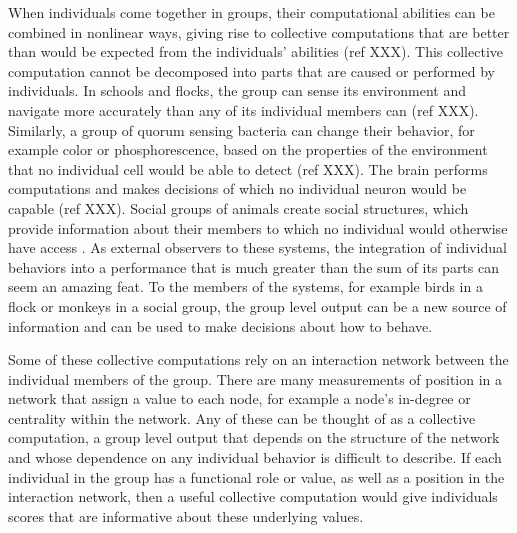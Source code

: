 \documentclass{article}
\begin{document}
When individuals come together in groups, their computational abilities can be combined in nonlinear ways, giving rise to collective computations that are better than would be expected from the individuals' abilities (ref XXX).  This collective computation cannot be decomposed into parts that are caused or performed by individuals. In schools and flocks, the group can sense its environment and navigate more accurately than any of its individual members can (ref XXX).  Similarly, a group of quorum sensing bacteria can change their behavior, for example color or phosphorescence, based on the properties of the environment that no individual cell would be able to detect (ref XXX). The brain performs computations and makes decisions of which no individual neuron would be capable (ref XXX). Social groups of animals create social structures, which provide information about their members to which no individual would otherwise have access \cite{Flack:2004oq,Flack:2006fk,Flack:2006uq}. As external observers to these systems, the integration of individual behaviors into a performance that is much greater than the sum of its parts can seem an amazing feat. To the members of the systems, for example birds in a flock or monkeys in a social group, the group level output can be a new source of information and can be used to make decisions about how to behave.

Some of these collective computations rely on an interaction network between the individual members of the group. There are many measurements of position in a network that assign a value to each node, for example a node's in-degree or centrality within the network.  Any of these can be thought of as a collective computation, a group level output that depends on the structure of the network and whose dependence on any individual behavior is difficult to describe.  If each individual in the group has a functional role or value, as well as a position in the interaction network, then a useful collective computation would give individuals scores that are informative about these underlying values.
\end{document}
